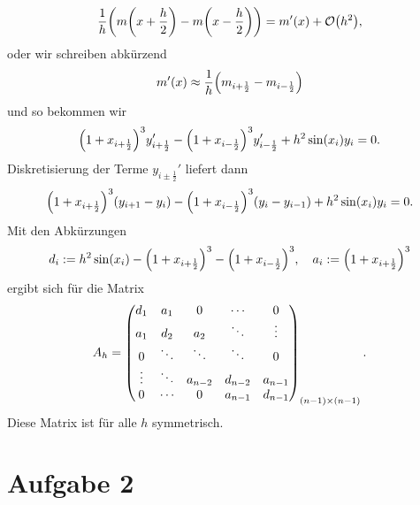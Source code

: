 \documentclass{exercise}
\begin{document}
\begin{enumerate}
        \[
            \frac{1}{h}\parentheses*{m\parentheses*{x + \frac{h}{2}} - m\parentheses*{x - \frac{h}{2}}} = m'\parentheses*{x} + \mathcal{O}\parentheses*{h^2},
        \]
        oder wir schreiben abkürzend
        \[
            m'\parentheses*{x} \approx \frac{1}{h}\parentheses*{m_{i + \frac{1}{2}} - m_{i - \frac{1}{2}}}
        \]
        und so bekommen wir
        \[
            \parentheses*{1 + x_{i + \frac{1}{2}}}^3 y_{i + \frac{1}{2}}' - \parentheses*{1 + x_{i - \frac{1}{2}}}^3 y_{i - \frac{1}{2}}' + h^2\sin\parentheses*{x_i}y_i = 0.
        \]
        Diskretisierung der Terme \(y_{i \pm \frac{1}{2}}'\) liefert dann
        \[
            \parentheses*{1 + x_{i + \frac{1}{2}}}^3 \parentheses*{y_{i + 1} - y_i} - \parentheses*{1 + x_{i - \frac{1}{2}}}^3 \parentheses*{y_i - y_{i - 1}} + h^2\sin\parentheses*{x_i}y_i = 0.
        \]
        Mit den Abkürzungen
        \[
            d_i := h^2 \sin\parentheses*{x_i} - \parentheses*{1 + x_{i + \frac{1}{2}}}^3 - \parentheses*{1 + x_{i - \frac{1}{2}}}^3, \quad a_i := \parentheses*{1 + x_{i + \frac{1}{2}}}^3
        \]
        ergibt sich für die Matrix
        \[
            A_h = \begin{pmatrix}
                d_1 & a_1 & 0 & \cdots & 0\\
                a_1 & d_2 & a_2 & \ddots & \vdots\\
                0 & \ddots & \ddots & \ddots & 0\\
                \vdots & \ddots & a_{n - 2} & d_{n - 2} & a_{n - 1}\\
                0 & \cdots & 0 & a_{n - 1} & d_{n - 1}
            \end{pmatrix}_{\parentheses*{n - 1} \times \parentheses*{n - 1}}.
        \]
        Diese Matrix ist für alle \(h\) symmetrisch.
    \end{enumerate}
    
    
    \section*{Aufgabe 2}
    
\end{document}
